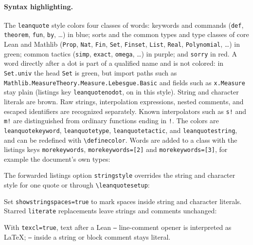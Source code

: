 \documentclass[11pt]{article}
\newcommand{\cs}[1]{\texttt{\textbackslash #1}}
\newcommand{\opt}[1]{\texttt{#1}}
\begin{document}
\paragraph{Syntax highlighting.} The \texttt{leanquote} style colors four classes of words: keywords and commands
(\texttt{def}, \texttt{theorem}, \texttt{fun}, \texttt{by}, \dots) in blue; sorts and the
common types and type classes of core Lean and Mathlib (\texttt{Prop}, \texttt{Nat},
\texttt{Fin}, \texttt{Set}, \texttt{Finset}, \texttt{List}, \texttt{Real},
\texttt{Polynomial}, \dots) in green; common tactics (\texttt{simp}, \texttt{exact},
\texttt{omega}, \dots) in purple; and \texttt{sorry} in red. A word directly after a dot is
part of a qualified name and is not colored: in \texttt{Set.univ} the head \texttt{Set} is green,
but import paths such as \texttt{Mathlib.MeasureTheory.Measure.Lebesgue.Basic} and fields such as
\texttt{x.Measure} stay plain (listings key \opt{leanquotenodot}, on in this style).
String and character literals are brown. Raw strings, interpolation expressions, nested
comments, and escaped identifiers are recognized separately. Known interpolators such as
\texttt{s!} and \texttt{m!} are distinguished from ordinary functions ending in \texttt{!}.
The colors are
\texttt{leanquotekeyword}, \texttt{leanquotetype}, \texttt{leanquotetactic}, and
\texttt{leanquotestring}, and can be
redefined with \cs{definecolor}. Words are added to a class with the \textsf{listings} keys
\opt{morekeywords}, \opt{morekeywords=[2]} and \opt{morekeywords=[3]}, for example the
document's own types:
\begin{latexsrc}
\end{latexsrc}
The forwarded \textsf{listings} option \opt{stringstyle} overrides the string and character
style for one quote or through \cs{leanquotesetup}:
\begin{latexsrc}
\end{latexsrc}
Set \opt{showstringspaces=true} to mark spaces inside string and character literals.
Starred \opt{literate} replacements leave strings and comments unchanged:
\begin{latexsrc}
\end{latexsrc}
With \opt{texcl=true}, text after a Lean \texttt{--} line-comment opener is interpreted as
\LaTeX; \texttt{--} inside a string or block comment stays literal.
\end{document}
